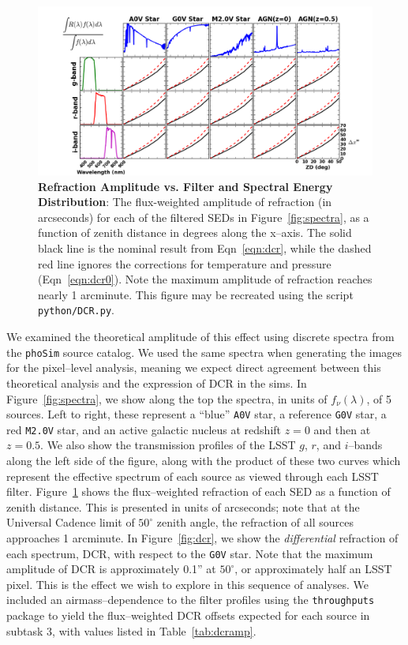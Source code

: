 \documentclass[DM,toc]{lsstdoc}
\begin{document}
\begin{figure}[!t]
  \centering
  \includegraphics[width=1.1\textwidth]{DCR2.png}
  \caption{{\bf Refraction Amplitude vs. Filter and Spectral Energy
      Distribution}: The flux-weighted amplitude of refraction (in
    arcseconds) for each of the filtered SEDs in
    Figure~\ref{fig:spectra}, as a function of zenith distance in
    degrees along the x--axis.  The solid black line is the nominal
    result from Eqn~\ref{eqn:dcr}, while the dashed red line ignores
    the corrections for temperature and pressure (Eqn~\ref{eqn:dcr0}).
    Note the maximum amplitude of refraction reaches nearly 1
    arcminute.  This figure may be recreated using the script {\tt
      python/DCR.py}.}
  \label{fig:refraction}
\end{figure}

We examined the theoretical amplitude of this effect using discrete
spectra from the {\tt phoSim} source catalog.  We used the same
spectra when generating the images for the pixel--level analysis,
meaning we expect direct agreement between this theoretical analysis
and the expression of DCR in the sims.  In Figure~\ref{fig:spectra},
we show along the top the spectra, in units of $f_\nu(\lambda)$, of 5
sources.  Left to right, these represent a ``blue'' {\tt A0V} star, a
reference {\tt G0V} star, a red {\tt M2.0V} star, and an active
galactic nucleus at redshift $z=0$ and then at $z=0.5$.  We also show
the transmission profiles of the LSST $g$, $r$, and $i$--bands along
the left side of the figure, along with the product of these two
curves which represent the effective spectrum of each source as viewed
through each LSST filter.  Figure~\ref{fig:refraction} shows the
flux--weighted refraction of each SED as a function of zenith
distance.  This is presented in units of arcseconds; note that at the
Universal Cadence limit of $50^{\circ}$ zenith angle, the refraction
of all sources approaches 1 arcminute.  In Figure~\ref{fig:dcr}, we
show the {\it differential} refraction of each spectrum, DCR, with
respect to the {\tt G0V} star.  Note that the maximum amplitude of DCR
is approximately 0.1'' at $50^{\circ}$, or approximately half an LSST
pixel.  This is the effect we wish to explore in this sequence of
analyses.  We included an airmass--dependence to the filter profiles
using the {\tt throughputs} package to yield the flux--weighted DCR
offsets expected for each source in subtask 3, with values listed in
Table~\ref{tab:dcramp}.
\end{document}
